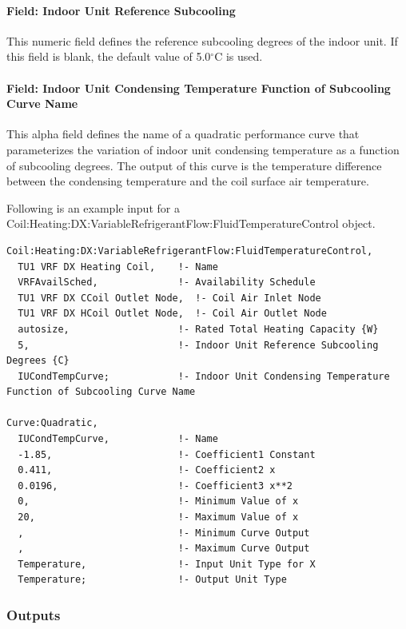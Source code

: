 \paragraph{Field: Indoor Unit Reference Subcooling}\label{field-indoor-unit-reference-subcooling}

This numeric field defines the reference subcooling degrees of the indoor unit. If this field is blank, the default value of 5.0$^\circ$C is used.

\paragraph{Field: Indoor Unit Condensing Temperature Function of Subcooling Curve Name}\label{field-indoor-unit-condensing-temperature-function-of-subcooling-curve-name}

This alpha field defines the name of a quadratic performance curve that parameterizes the variation of indoor unit condensing temperature as a function of subcooling degrees. The output of this curve is the temperature difference between the condensing temperature and the coil surface air temperature.

Following is an example input for a Coil:Heating:DX:VariableRefrigerantFlow:FluidTemperatureControl object.

\begin{lstlisting}
Coil:Heating:DX:VariableRefrigerantFlow:FluidTemperatureControl,
  TU1 VRF DX Heating Coil,    !- Name
  VRFAvailSched,              !- Availability Schedule
  TU1 VRF DX CCoil Outlet Node,  !- Coil Air Inlet Node
  TU1 VRF DX HCoil Outlet Node,  !- Coil Air Outlet Node
  autosize,                   !- Rated Total Heating Capacity {W}
  5,                          !- Indoor Unit Reference Subcooling Degrees {C}
  IUCondTempCurve;            !- Indoor Unit Condensing Temperature Function of Subcooling Curve Name

Curve:Quadratic,
  IUCondTempCurve,            !- Name
  -1.85,                      !- Coefficient1 Constant
  0.411,                      !- Coefficient2 x
  0.0196,                     !- Coefficient3 x**2
  0,                          !- Minimum Value of x
  20,                         !- Maximum Value of x
  ,                           !- Minimum Curve Output
  ,                           !- Maximum Curve Output
  Temperature,                !- Input Unit Type for X
  Temperature;                !- Output Unit Type
\end{lstlisting}

\subsubsection{Outputs}\label{outputs-8-002}


